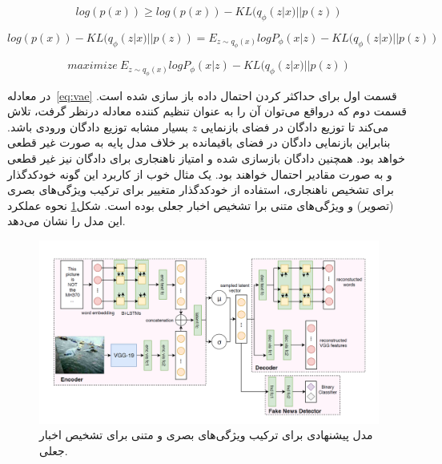 \documentclass[12pt,a4paper]{report}
\begin{document}
\begin{equation}
log(p(x)) \ge log(p(x)) - KL(q_\phi(z|x) || p(z))
\end{equation}

\begin{equation}
log(p(x)) - KL(q_\phi(z|x) || p(z)) = E_{z \sim q_\phi(x)}logP_\phi(x|z)  -  KL(q_\phi(z|x) || p(z))
\end{equation}


\begin{equation}
maximize\  E_{z \sim q_\phi(x)}logP_\phi(x|z)  -  KL(q_\phi(z|x) || p(z))
\label{eq:vae}
\end{equation}

در معادله~\eqref{eq:vae} قسمت اول برای حداکثر کردن احتمال داده باز سازی شده است. قسمت دوم که درواقع می‌توان آن را به عنوان تنظیم کننده معادله درنظر گرفت، تلاش می‌کند تا توزیع دادگان در فضای بازنمایی $z$ بسیار مشابه توزیع دادگان ورودی باشد. بنابراین بازنمایی دادگان در فضای باقیمانده بر خلاف مدل پایه به صورت غیر قطعی خواهد بود. همچنین دادگان بازسازی شده و امتیاز ناهنجاری برای دادگان نیز غیر قطعی و به صورت مقادیر احتمال خواهند بود. یک مثال خوب از کاربرد این گونه خودکدگذار برای تشخیص ناهنجاری، استفاده از خودکدگذار متغییر برای ترکیب ویژگی‌های بصری (تصویر) و ویژگی‌های متنی برا تشخیص اخبار جعلی بوده است\cite{10.1145/3308558.3313552}. شکل\ref{fig:khattar} نحوه عملکرد این مدل را نشان می‌دهد.

\begin{figure}[!h]
	\begin{center}
		\includegraphics[width=1\linewidth]{./images/figures/khattar.png}
	\end{center}
	\caption{مدل پیشنهادی برای ترکیب ویژگی‌های بصری و متنی برای تشخیص اخبار جعلی\cite{10.1145/3308558.3313552}.}
	\label{fig:khattar}
	\centering
\end{figure}
\end{document}
